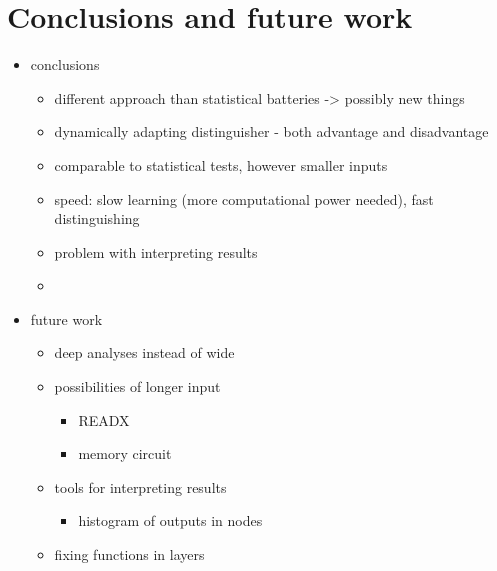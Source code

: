 \documentclass[12pt,oneside]{fithesis2}
\begin{document}
\chapter{Conclusions and future work}
\label{chap:conclusions}
\begin{itemize}
\item conclusions
\begin{itemize}
\item different approach than statistical batteries -> possibly new things
\item dynamically adapting distinguisher - both advantage and disadvantage
\item comparable to statistical tests, however smaller inputs
\item speed: slow learning (more computational power needed), fast distinguishing
\item problem with interpreting results
\item 
\end{itemize}
\item future work
\begin{itemize}
\item deep analyses instead of wide
\item possibilities of longer input 
\begin{itemize}
\item READX
\item memory circuit
\end{itemize}
\item tools for interpreting results
\begin{itemize}
\item histogram of outputs in nodes
\end{itemize}
\item fixing functions in layers
\end{itemize}
\end{itemize}
\end{document}
